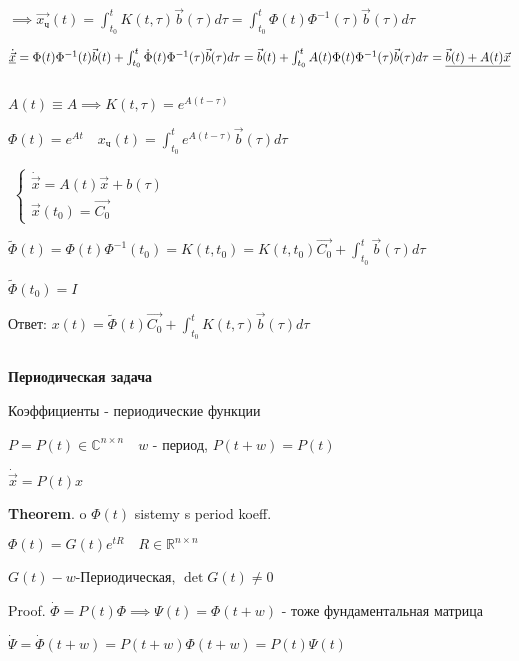 \documentclass[12pt, a4paper]{article}
\begin{document}
    $\implies \vec{x_\text{ч}}(t) = \int^t_{t_0} K(t, \tau)\vec{b}(\tau)d\tau = 
    \int^t_{t_0}\Phi(t)\Phi^{-1}(\tau)\vec{b}(\tau)d\tau$

    $\underline{\dot{\vec{x}}} = \Phi(t)\Phi^{-1}(t)\vec{b}(t) + 
    \int^t_{t_0} \dot \Phi(t) \Phi^{-1}(\tau)\vec{b}(\tau)d\tau = 
    \vec{b}(t) + \int^t_{t_0}A(t)\Phi(t)\Phi^{-1}(\tau)\vec{b}(\tau)d\tau = \\
    \underline{\vec{b}(t) + A(t)\vec{x}}$

    \par $ $

    $A(t) \equiv A \implies K(t, \tau) = e^{A(t-\tau)}$

    $\Phi(t) =e^{At} \quad x_{\text{ч}}(t) = \int^t_{t_0}e^{A(t-\tau)}\vec{b}(\tau)d\tau$

    \par $ $
    $\begin{cases}
        \dot{\vec{x}} = A(t)\vec{x} + b(\tau) \\
        \vec{x}(t_0) = \vec{C_0}
    \end{cases}$

    
    $\widetilde{\Phi}(t) = \Phi(t)\Phi^{-1}(t_0) = K(t, t_0) = 
    K(t, t_0)\vec{C_0} + \int^t_{t_0}\vec{b}(\tau)d\tau$
    
    $\widetilde{\Phi}(t_0) = I$

    Ответ: $x(t) = \widetilde{\Phi}(t)\vec{C_0} + 
    \int^t_{t_0}K(t, \tau)\vec{b}(\tau)d\tau$

    \par $ $

    \textbf{Периодическая задача}

    Коэффициенты - периодические функции

    $P = P(t) \in \mathbb{C}^{n\times n}\quad w $ - период, $P(t+w) = P(t)$

    $\dot{\vec{x}} = P(t)x$

    \textbf{Theorem}. o $\Phi(t)$ sistemy s period koeff.

    $\Phi(t) = G(t)e^{tR} \quad R \in \mathbb{R}^{n\times n}$

    $G(t) - w$-Периодическая, $\det G(t) \neq 0$

    Proof. $\dot\Phi = P(t)\Phi \implies \Psi(t) = \Phi(t + w)$ - тоже
    фундаментальная матрица

    $\dot\Psi = \dot\Phi(t + w) = P(t + w) \Phi(t + w) = P(t)\Psi(t)$
\end{document}
